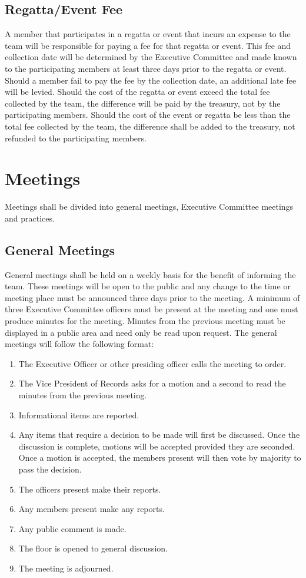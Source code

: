 \documentclass[12pt,titlepage,letter]{article}
\begin{document}
\subsection{Regatta/Event Fee}
A member that participates in a regatta or event that incurs an expense to the team will be responsible for paying a fee for that regatta or event. This fee and collection date will be determined by the Executive Committee and made known to the participating members at least three days prior to the regatta or event. Should a member fail to pay the fee by the collection date, an additional late fee will be levied. Should the cost of the regatta or event exceed the total fee collected by the team, the difference will be paid by the treasury, not by the participating members. Should the cost of the event or regatta be less than the total fee collected by the team, the difference shall be added to the treasury, not refunded to the participating members.


\section{Meetings \label{meeting}}
Meetings shall be divided into general meetings, Executive Committee meetings and practices.
\subsection{General Meetings \label{meeting:general}}
General meetings shall be held on a weekly basis for the benefit of informing the team. These meetings will be open to the public and any change to the time or meeting place must be announced three days prior to the meeting. A minimum of three Executive Committee officers must be present at the meeting and one must produce minutes for the meeting. Minutes from the previous meeting must be displayed in a public area and need only be read upon request. The general meetings will follow the following format:
\begin{enumerate}
\item
The Executive Officer or other presiding officer calls the meeting to order.
\item
The Vice President of Records asks for a motion and a second to read the minutes from the previous meeting.
\item
Informational items are reported.
\item
Any items that require a decision to be made will first be discussed. Once the discussion is complete, motions will be accepted provided they are seconded. Once a motion is accepted, the members present will then vote by majority to pass the decision.
\item
The officers present make their reports.
\item
Any members present make any reports.
\item
Any public comment is made.
\item
The floor is opened to general discussion.
\item
The meeting is adjourned.
\end{enumerate}
\end{document}
